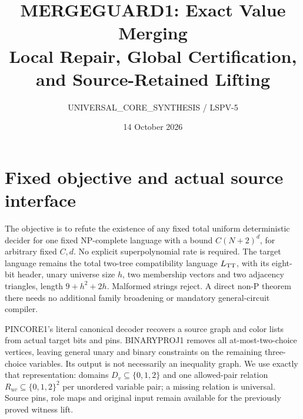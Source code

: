 \documentclass[11pt]{article}
\title{MERGEGUARD1: Exact Value Merging\\\large Local Repair, Global Certification, and Source-Retained Lifting}
\author{UNIVERSAL\_CORE\_SYNTHESIS / LSPV-5}
\date{14 October 2026}
\newcommand{\COL}{\{0,1,2\}}
\begin{document}
\maketitle
\begin{center}
\end{center}

\section{Fixed objective and actual source interface}
The objective is to refute the existence of any fixed total uniform
deterministic decider for one fixed NP-complete language with a bound
$C(N+2)^d$, for arbitrary fixed $C,d$. No explicit superpolynomial rate is
required. The target language remains the total two-tree compatibility
language $L_{\rm TT}$, with its eight-bit header, unary universe size $h$,
two membership vectors and two adjacency triangles, length $9+h^2+2h$.
Malformed strings reject. A direct non-P theorem there needs no additional
family broadening or mandatory general-circuit compiler.

PINCORE1's literal canonical decoder recovers a source graph and color lists
from actual target bits and pins. BINARYPROJ1 removes all at-most-two-choice
vertices, leaving general unary and binary constraints on the remaining
three-choice variables. Its output is not necessarily an inequality graph.
We use exactly that representation: domains $D_v\subseteq\COL$ and one
allowed-pair relation $R_{uv}\subseteq\COL^2$ per unordered variable pair;
a missing relation is universal. Source pins, role maps and original input
remain available for the previously proved witness lift.
\end{document}
